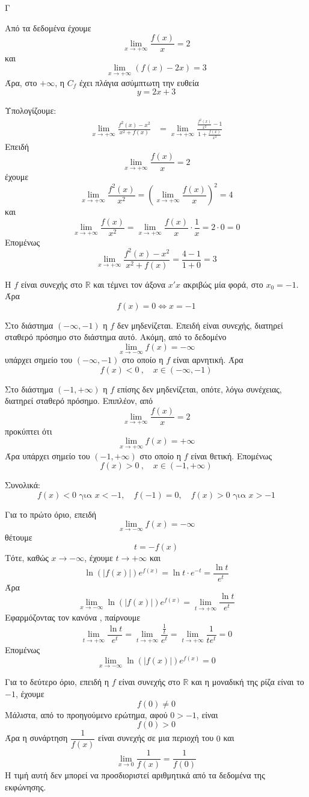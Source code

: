 \begin{thema}{Γ}
\begin{erwthma}
\item Από τα δεδομένα έχουμε
\[
\lim\limits_{x\to+\infty}\frac{f(x)}{x}=2
\]
και
\[
\lim\limits_{x\to+\infty}\left(f(x)-2x\right)=3
\]
Άρα, στο $+\infty$, η $C_f$ έχει πλάγια ασύμπτωτη την ευθεία
\[
y=2x+3
\]

\item Υπολογίζουμε:
\begin{align*}
\lim\limits_{x\to+\infty}\frac{f^2(x)-x^2}{x^2+f(x)}
&=\lim\limits_{x\to+\infty}
\frac{\frac{f^2(x)}{x^2}-1}{1+\frac{f(x)}{x^2}}
\end{align*}
Επειδή
\[
\lim\limits_{x\to+\infty}\frac{f(x)}{x}=2
\]
έχουμε
\[
\lim\limits_{x\to+\infty}\frac{f^2(x)}{x^2}
=\left(\lim\limits_{x\to+\infty}\frac{f(x)}{x}\right)^2
=4
\]
και
\[
\lim\limits_{x\to+\infty}\frac{f(x)}{x^2}
=\lim\limits_{x\to+\infty}\frac{f(x)}{x}\cdot\frac{1}{x}
=2\cdot 0=0
\]
Επομένως
\[
\lim\limits_{x\to+\infty}\frac{f^2(x)-x^2}{x^2+f(x)}
=\frac{4-1}{1+0}=3
\]

\item Η $f$ είναι συνεχής στο $\mathbb{R}$ και τέμνει τον άξονα $x'x$ ακριβώς μία φορά, στο $x_0=-1$.
Άρα
\[
f(x)=0\Leftrightarrow x=-1
\]

Στο διάστημα $(-\infty,-1)$ η $f$ δεν μηδενίζεται.
Επειδή είναι συνεχής, διατηρεί σταθερό πρόσημο στο διάστημα αυτό.
Ακόμη, από το δεδομένο
\[
\lim\limits_{x\to-\infty}f(x)=-\infty
\]
υπάρχει σημείο του $(-\infty,-1)$ στο οποίο η $f$ είναι αρνητική.
Άρα
\[
f(x)<0\ ,\quad x\in(-\infty,-1)
\]

Στο διάστημα $(-1,+\infty)$ η $f$ επίσης δεν μηδενίζεται, οπότε, λόγω συνέχειας, διατηρεί σταθερό πρόσημο.
Επιπλέον, από
\[
\lim\limits_{x\to+\infty}\frac{f(x)}{x}=2
\]
προκύπτει ότι
\[
\lim\limits_{x\to+\infty}f(x)=+\infty
\]
Άρα υπάρχει σημείο του $(-1,+\infty)$ στο οποίο η $f$ είναι θετική.
Επομένως
\[
f(x)>0\ ,\quad x\in(-1,+\infty)
\]

Συνολικά:
\[
f(x)<0 \text{ για } x<-1,\quad f(-1)=0,\quad f(x)>0 \text{ για } x>-1
\]

\item Για το πρώτο όριο, επειδή
\[
\lim\limits_{x\to-\infty}f(x)=-\infty
\]
θέτουμε
\[
t=-f(x)
\]
Τότε, καθώς $x\to-\infty$, έχουμε $t\to+\infty$ και
\[
\ln(|f(x)|)e^{f(x)}=\ln t\cdot e^{-t}=\frac{\ln t}{e^t}
\]
Άρα
\[
\lim\limits_{x\to-\infty}\ln(|f(x)|)e^{f(x)}
=\lim\limits_{t\to+\infty}\frac{\ln t}{e^t}
\]
Εφαρμόζοντας τον κανόνα , παίρνουμε
\[
\lim\limits_{t\to+\infty}\frac{\ln t}{e^t}
=\lim\limits_{t\to+\infty}\frac{\frac{1}{t}}{e^t}
=\lim\limits_{t\to+\infty}\frac{1}{te^t}=0
\]
Επομένως
\[
\lim\limits_{x\to-\infty}\ln(|f(x)|)e^{f(x)}=0
\]

Για το δεύτερο όριο, επειδή η $f$ είναι συνεχής στο $\mathbb{R}$ και η μοναδική της ρίζα είναι το $-1$, έχουμε
\[
f(0)\neq 0
\]
Μάλιστα, από το προηγούμενο ερώτημα, αφού $0>-1$, είναι
\[
f(0)>0
\]
Άρα η συνάρτηση $\dfrac{1}{f(x)}$ είναι συνεχής σε μια περιοχή του $0$ και
\[
\lim\limits_{x\to 0}\frac{1}{f(x)}=\frac{1}{f(0)}
\]
Η τιμή αυτή δεν μπορεί να προσδιοριστεί αριθμητικά από τα δεδομένα της εκφώνησης.
\end{erwthma}
\end{thema}
